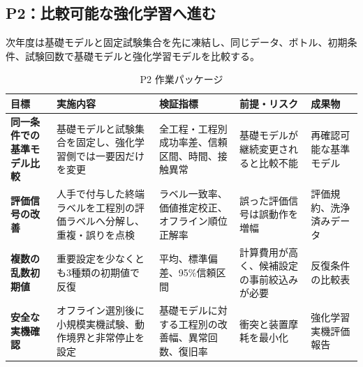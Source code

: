 \begin{landscape}
\section{P2：比較可能な強化学習へ進む}

次年度は基礎モデルと固定試験集合を先に凍結し、同じデータ、ボトル、初期条件、試験回数で基礎モデルと強化学習モデルを比較する。

\begin{table}[H]
\centering\footnotesize
\renewcommand{\arraystretch}{1.35}
\caption{P2 作業パッケージ}
\begin{tabularx}{\linewidth}{>{\bfseries}p{28mm}p{52mm}p{66mm}p{56mm}X}
\toprule
目標 & 実施内容 & 検証指標 & 前提・リスク & 成果物\\
\midrule
同一条件での基準モデル比較 & 基礎モデルと試験集合を固定し、強化学習側では一要因だけを変更 & 全工程・工程別成功率差、信頼区間、時間、接触異常 & 基礎モデルが継続変更されると比較不能 & 再確認可能な基準モデル\\
評価信号の改善 & 人手で付与した終端ラベルを工程別の評価ラベルへ分解し、重複・誤りを点検 & ラベル一致率、価値推定校正、オフライン順位正解率 & 誤った評価信号は誤動作を増幅 & 評価規約、洗浄済みデータ\\
複数の乱数初期値 & 重要設定を少なくとも3種類の初期値で反復 & 平均、標準偏差、95\%信頼区間 & 計算費用が高く、候補設定の事前絞込みが必要 & 反復条件の比較表\\
安全な実機確認 & オフライン選別後に小規模実機試験、動作境界と非常停止を設定 & 基礎モデルに対する工程別の改善幅、異常回数、復旧率 & 衝突と装置摩耗を最小化 & 強化学習実機評価報告\\
\bottomrule
\end{tabularx}
\end{table}
\end{landscape}

